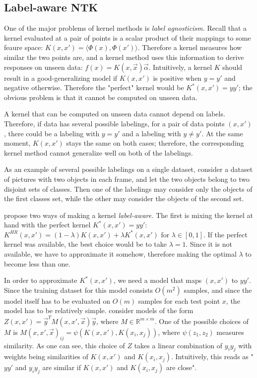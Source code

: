 \documentclass{article}
\newcommand{\RR}{\mathbb{R}}
\begin{document}
    \subsection{Label-aware NTK}

    One of the major problems of kernel methods is \emph{label agnosticism.}
    Recall that a kernel evaluated at a pair of points is a scalar product of their mappings to some feaure space: $K(x,x') = \langle \Phi(x), \Phi(x') \rangle$.
    Therefore a kernel measures how similar the two points are, and a kernel method uses this information to derive responses on unseen data: $f(x) = K(x,\vec x) \vec\alpha$.
    Intuitively, a kernel $K$ should result in a good-generalizing model if $K(x,x')$ is positive when $y=y'$ and negative otherwise.
    Therefore the "perfect" kernel would be $K^*(x,x') = y y'$; the obvious problem is that it cannot be computed on unseen data.

    A kernel that can be computed on unseen data cannot depend on labels.
    Therefore, if data has several possible labelings, for a pair of data points $(x,x')$, there could be a labeling with $y=y'$ and a labeling with $y\neq y'$.
    At the same moment, $K(x,x')$ stays the same on both cases; therefore, the corresponding kernel method cannot generalize well on both of the labelings.

    As an example of several possible labelings on a single dataset, consider a dataset of pictures with two objects in each frame, and let the two objects belong to two disjoint sets of classes.
    Then one of the labelings may consider only the objects of the first classes set, while the other may consider the objects of the second set.

    \cite{chen2020label} propose two ways of making a kernel \emph{label-aware.}
    The first is mixing the kernel at hand with the perfect kernel $K^*(x,x') = y y'$: $K^{HR}(x,x') = (1-\lambda) K(x,x') + \lambda K^*(x,x')$ for $\lambda \in [0,1]$.
    If the perfect kernel was available, the best choice would be to take $\lambda=1$.
    Since it is not available, we have to approximate it somehow, therefore making the optimal $\lambda$ to become less than one.

    In order to approximate $K^*(x,x')$, we need a model that maps $(x,x')$ to $y y'$.
    Since the training dataset for this model consists $O(m^2)$ samples, and since the model itself has to be evaluated on $O(m)$ samples for each test point $x$, the model has to be relatively simple.
    \cite{chen2020label} consider models of the form $Z(x,x') = \vec y^T M(x,x',\vec x) \vec y$, where $M \in \RR^{m \times m}$.
    One of the possible choices of $M$ is $M(x,x',\vec x)_{ij} = \psi(K(x,x'),K(x_i,x_j))$, where $\psi(z_1,z_2)$ measures similarity.
    As one can see, this choice of $Z$ takes a linear combination of $y_i y_j$ with weights being similarities of $K(x,x')$ and $K(x_i,x_j)$.
    Intuitively, this reads as "$y y'$ and $y_i y_j$ are similar if $K(x,x')$ and $K(x_i,x_j)$ are close".
\end{document}
